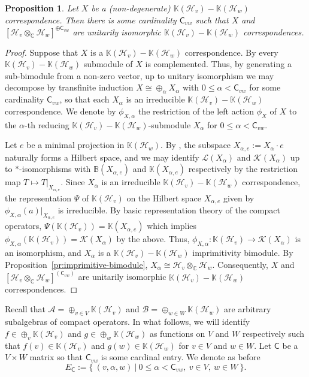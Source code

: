 \documentclass[11pt, letterpaper,final]{amsart}
\newcommand{\A}{{\mathcal{A}}}
\newcommand{\B}{{\mathcal{B}}}
\renewcommand{\H}{{\mathcal{H}}}
\newcommand{\K}{{\mathcal{K}}}
\renewcommand{\L}{{\mathcal{L}}}
\newcommand{\bbB}{{\mathbb{B}}}
\newcommand{\bbK}{{\mathbb{K}}}
\newtheorem{prp}[thm]{Proposition}
\theoremstyle{definition}
\begin{document}
\begin{prp} \label{pr:stnd-cor-decomp}
Let $X$ be a (non-degenerate) $\bbK(\H_v)-\bbK(\H_w)$ correspondence. Then there is some cardinality $\mathsf{C}_{vw}$ such that $X$ and $[\H_v\otimes_\mathbb{C} \H_w]^{ \oplus \mathsf{C}_{vw}}$ are unitarily isomorphic $\bbK(\H_v)-\bbK(\H_w)$ correspondences.
\end{prp}

\begin{proof}
Suppose that $X$ is a $\bbK(\H_v)-\bbK(\H_w)$ correspondence. By \cite[Theorem 1]{Mag97} every $\bbK(\H_v)-\bbK(\H_w)$ submodule of $X$ is complemented. Thus, by generating a sub-bimodule from a non-zero vector, up to unitary isomorphism we may decompose by transfinite induction $X \cong \oplus_{\alpha} X_{\alpha}$ with $0 \leq \alpha < \mathsf{C}_{vw}$ for some cardinality $\mathsf{C}_{vw}$, so that each $X_{\alpha}$ is an irreducible $\bbK(\H_v)-\bbK(\H_w)$ correspondence. We denote by $\phi_{X,\alpha}$ the restriction of the left action $\phi_X$ of $X$ to the $\alpha$-th reducing $\bbK(\H_v)-\bbK(\H_w)$-submodule $X_{\alpha}$ for $0\leq \alpha < \mathsf{C}_{vw}$.

Let $e$ be a minimal projection in $\bbK(\H_w)$.  By \cite[Theorem~5 and 6]{BG02}, the subspace $X_{\alpha,e}:= X_{\alpha}\cdot e$ naturally forms a Hilbert space, and we may identify $\L(X_{\alpha})$ and $\K(X_\alpha)$ up to $*$-isomorphisms with $\bbB(X_{\alpha,e})$ and $\bbK(X_{\alpha, e})$  respectively by the restriction map $T \mapsto T|_{X_{\alpha,e}}$.  Since $X_\alpha$ is an irreducible $\bbK(\H_v)-\bbK(\H_w)$ correspondence, the representation $\Psi$ of $\bbK(\H_v)$ on the Hilbert space $X_{\alpha, e}$ given by $\phi_{X, \alpha} (a) \vert_{X_{\alpha, e} }$ is irreducible.  By basic representation theory of the compact operators, $\Psi(\bbK(\H_v)) = \bbK(X_{\alpha, e} )$ which implies $\phi_{X, \alpha} ( \bbK(\H_v)) = \K(X_{\alpha})$ by the above.  Thus, $\phi_{X, \alpha } \colon \bbK(\H_v) \to \K(X_{\alpha})$ is an isomorphism, and $X_\alpha$ is a $\bbK(\H_v)-\bbK(\H_w)$ imprimitivity bimodule.  By Proposition~\ref{pr:imprimitive-bimodule}, $X_\alpha \cong \H_v \otimes_\mathbb{C} \H_w$.  Consequently, $X$ and $[\H_v\otimes_\mathbb{C} \H_w]^{(\mathsf{C}_{vw})}$ are unitarily isomorphic $\bbK(\H_v)-\bbK(\H_w)$ correspondences.
\end{proof}

Recall that $\A= \oplus_{v\in V}\bbK(\H_v)$ and $\B=\oplus_{w\in W}\bbK(\H_w)$ are arbitrary subalgebras of compact operators. In what follows, we will identify $f \in \oplus_v \bbK(\H_v)$ and $g \in \oplus_w \bbK(\H_w)$ as functions on $V$ and $W$ respectively such that $f(v)\in \bbK(\H_v)$ and $g(w) \in \bbK(\H_w)$ for $v\in V$ and $w\in W$. Let $\mathsf{C}$ be a $V\times W$ matrix so that $\mathsf{C}_{vw}$ is some cardinal entry. We denote as before
$$
E_\mathsf{C}:= \{ \ (v,\alpha,w) \ | \ 0\leq \alpha < \mathsf{C}_{vw}, \ v\in V, \ w\in W \ \}.
$$
\end{document}
